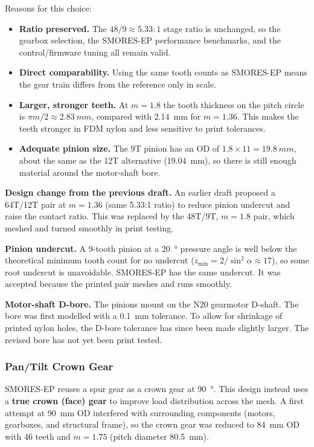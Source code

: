 \documentclass[12pt,a4paper]{article}
\begin{document}
Reasons for this choice:
\begin{itemize}
	\item \textbf{Ratio preserved.} The $48/9 \approx 5.33{:}1$ stage ratio is
	      unchanged, so the gearbox selection, the SMORES-EP performance
	      benchmarks, and the control/firmware tuning all remain valid.
	\item \textbf{Direct comparability.} Using the same tooth counts as SMORES-EP
	      means the gear train differs from the reference only in scale.
	\item \textbf{Larger, stronger teeth.} At $m = 1.8$ the tooth thickness on the
	      pitch circle is $\pi m/2 \approx \SI{2.83}{mm}$, compared with
	      \SI{2.14}{mm} for $m = 1.36$. This makes the teeth stronger in FDM nylon
	      and less sensitive to print tolerances.
	\item \textbf{Adequate pinion size.} The 9T pinion has an OD of
	      $1.8 \times 11 = \SI{19.8}{mm}$, about the same as the 12T alternative
	      (\SI{19.04}{mm}), so there is still enough material around the
	      motor-shaft bore.
\end{itemize}

\textbf{Design change from the previous draft.} An earlier draft proposed a
64T/12T pair at $m = 1.36$ (same 5.33:1 ratio) to reduce pinion undercut and
raise the contact ratio. This was replaced by the 48T/9T, $m = 1.8$ pair, which
meshed and turned smoothly in print testing.

\textbf{Pinion undercut.} A 9-tooth pinion at a \SI{20}{\degree} pressure angle is
well below the theoretical minimum tooth count for no undercut
($z_{\min} = 2/\sin^2\alpha \approx 17$), so some root undercut is unavoidable.
SMORES-EP has the same undercut. It was accepted because the printed pair meshes
and runs smoothly.

\textbf{Motor-shaft D-bore.} The pinions mount on the N20 gearmotor D-shaft.
The bore was first modelled with a \SI{0.1}{mm} tolerance. To allow for
shrinkage of printed nylon holes, the D-bore tolerance has since been made
slightly larger. The revised bore has not yet been print tested.

\subsubsection{Pan/Tilt Crown Gear}

SMORES-EP reuses a spur gear as a crown gear at \SI{90}{\degree}. This design
instead uses a \textbf{true crown (face) gear} to improve load distribution
across the mesh. A first attempt at \SI{90}{mm} OD interfered with surrounding
components (motors, gearboxes, and structural frame), so the crown gear was
reduced to \SI{84}{mm} OD with 46 teeth and $m = 1.75$ (pitch diameter
\SI{80.5}{mm}).
\end{document}
